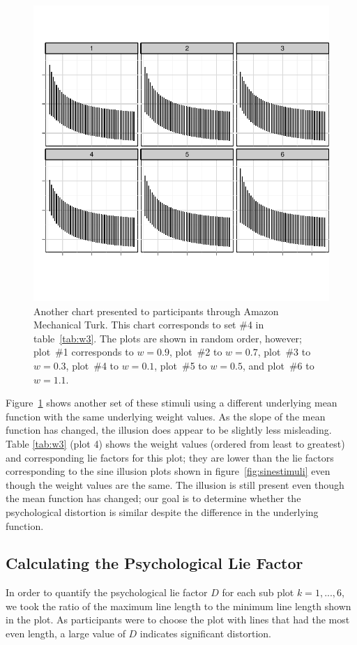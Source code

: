 \documentclass[11pt]{isuthesis}\usepackage[]{graphicx}\usepackage[]{color}
\begin{document}
\begin{figure}[tb]
\centering
\includegraphics[width=6in]{fig-stimulicorrectionsize3}
\caption{Another chart presented to participants through Amazon Mechanical Turk. This chart corresponds to set \#4 in table~\ref{tab:w3}. The plots are shown in random order, however; plot~\#1 corresponds to $w=0.9$, plot~\#2 to $w=0.7$, plot~\#3 to $w=0.3$, plot~\#4 to $w=0.1$, plot~\#5 to $w=0.5$, and plot~\#6 to $w=1.1$.}\label{fig:invstimuli}
\end{figure}

Figure~\ref{fig:invstimuli} shows another set of these stimuli using a different underlying mean function with the same underlying weight values. As the slope of the mean function has changed, the illusion does appear to be slightly less misleading. Table \ref{tab:w3} (plot 4) shows the weight values (ordered from least to greatest) and corresponding lie factors for this plot; they are lower than the lie factors corresponding to the sine illusion plots shown in figure~\ref{fig:sinestimuli} even though the weight values are the same. The illusion is still present even though the mean function has changed; our goal is to determine whether the psychological distortion is similar despite the difference in the underlying function.

\subsection{Calculating the Psychological Lie Factor}
In order to quantify the psychological lie factor $D$ for each sub plot $k=1, ..., 6$, we took the ratio of the maximum line length to the minimum line length shown in the plot. As participants were to choose the plot with lines that had the most even length, a large value of $D$ indicates significant distortion. 
\end{document}
